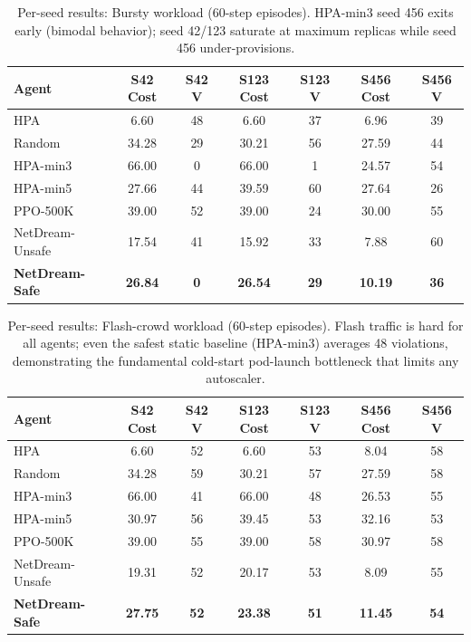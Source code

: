 \begin{table}[H]
\centering
\small
\caption{Per-seed results: Bursty workload (60-step episodes).
HPA-min3 seed 456 exits early (bimodal behavior); seed 42/123 saturate
at maximum replicas while seed 456 under-provisions.}
\label{tab:perseed-bursty}
\setlength{\tabcolsep}{4pt}
\begin{tabular}{@{}lcccccc@{}}
\toprule
Agent & S42 Cost & S42 V & S123 Cost & S123 V & S456 Cost & S456 V \\
\midrule
HPA             & 6.60  & 48 & 6.60  & 37 & 6.96  & 39 \\
Random          & 34.28 & 29 & 30.21 & 56 & 27.59 & 44 \\
HPA-min3        & 66.00 & 0  & 66.00 & 1  & 24.57 & 54 \\
HPA-min5        & 27.66 & 44 & 39.59 & 60 & 27.64 & 26 \\
PPO-500K        & 39.00 & 52 & 39.00 & 24 & 30.00 & 55 \\
NetDream-Unsafe & 17.54 & 41 & 15.92 & 33 & 7.88  & 60 \\
\textbf{NetDream-Safe} & \textbf{26.84} & \textbf{0} & \textbf{26.54} & \textbf{29} & \textbf{10.19} & \textbf{36} \\
\bottomrule
\end{tabular}
\end{table}

\begin{table}[H]
\centering
\small
\caption{Per-seed results: Flash-crowd workload (60-step episodes).
Flash traffic is hard for all agents; even the safest static baseline
(HPA-min3) averages 48 violations, demonstrating the fundamental
cold-start pod-launch bottleneck that limits any autoscaler.}
\label{tab:perseed-flash}
\setlength{\tabcolsep}{4pt}
\begin{tabular}{@{}lcccccc@{}}
\toprule
Agent & S42 Cost & S42 V & S123 Cost & S123 V & S456 Cost & S456 V \\
\midrule
HPA             & 6.60  & 52 & 6.60  & 53 & 8.04  & 58 \\
Random          & 34.28 & 59 & 30.21 & 57 & 27.59 & 58 \\
HPA-min3        & 66.00 & 41 & 66.00 & 48 & 26.53 & 55 \\
HPA-min5        & 30.97 & 56 & 39.45 & 53 & 32.16 & 53 \\
PPO-500K        & 39.00 & 55 & 39.00 & 58 & 30.97 & 58 \\
NetDream-Unsafe & 19.31 & 52 & 20.17 & 53 & 8.09  & 55 \\
\textbf{NetDream-Safe} & \textbf{27.75} & \textbf{52} & \textbf{23.38} & \textbf{51} & \textbf{11.45} & \textbf{54} \\
\bottomrule
\end{tabular}
\end{table}

